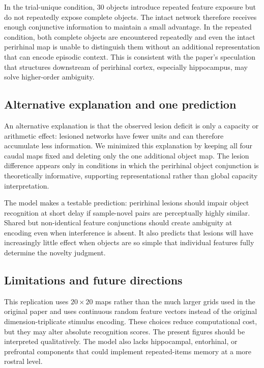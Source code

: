 \documentclass[11pt]{article}
\begin{document}
In the trial-unique condition, 30 objects introduce repeated feature exposure but do not repeatedly expose complete objects. The intact network therefore receives enough conjunctive information to maintain a small advantage. In the repeated condition, both complete objects are encountered repeatedly and even the intact perirhinal map is unable to distinguish them without an additional representation that can encode episodic context. This is consistent with the paper's speculation that structures downstream of perirhinal cortex, especially hippocampus, may solve higher-order ambiguity.

\subsection{Alternative explanation and one prediction}
An alternative explanation is that the observed lesion deficit is only a capacity or arithmetic effect: lesioned networks have fewer units and can therefore accumulate less information. We minimized this explanation by keeping all four caudal maps fixed and deleting only the one additional object map. The lesion difference appears only in conditions in which the perirhinal object conjunction is theoretically informative, supporting representational rather than global capacity interpretation.

The model makes a testable prediction: perirhinal lesions should impair object recognition at short delay if sample-novel pairs are perceptually highly similar. Shared but non-identical feature conjunctions should create ambiguity at encoding even when interference is absent. It also predicts that lesions will have increasingly little effect when objects are so simple that individual features fully determine the novelty judgment.

\subsection{Limitations and future directions}
This replication uses $20\times20$ maps rather than the much larger grids used in the original paper and uses continuous random feature vectors instead of the original dimension-triplicate stimulus encoding. These choices reduce computational cost, but they may alter absolute recognition scores. The present figures should be interpreted qualitatively. The model also lacks hippocampal, entorhinal, or prefrontal components that could implement repeated-items memory at a more rostral level.
\end{document}
